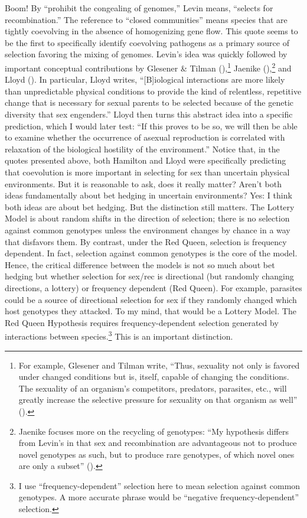 \documentclass[
  letterpaper,
]{book}
\begin{document}
Boom! By ``prohibit the congealing of genomes,'' Levin means, ``selects
for recombination.'' The reference to ``closed communities'' means
species that are tightly coevolving in the absence of homogenizing gene
flow. This quote seems to be the first to specifically identify
coevolving pathogens as a primary source of selection favoring the
mixing of genomes. Levin's idea was quickly followed by important
conceptual contributions by Glesener \& Tilman
(),\footnote{For example, Glesener and
  Tilman write, ``Thus, sexuality not only is favored under changed
  conditions but is, itself, capable of changing the conditions. The
  sexuality of an organism's competitors, predators, parasites, etc.,
  will greatly increase the selective pressure for sexuality on that
  organism as well'' ().} Jaenike
(),\footnote{Jaenike focuses more on
  the recycling of genotypes: ``My hypothesis differs from Levin's in
  that sex and recombination are advantageous not to produce novel
  genotypes as such, but to produce rare genotypes, of which novel ones
  are only a subset'' ().} and Lloyd
(). In particular, Lloyd writes,
``{[}B{]}iological interactions are more likely than unpredictable
physical conditions to provide the kind of relentless, repetitive change
that is necessary for sexual parents to be selected because of the
genetic diversity that sex engenders.'' Lloyd then turns this abstract
idea into a specific prediction, which I would later test: ``If this
proves to be so, we will then be able to examine whether the occurrence
of asexual reproduction is correlated with relaxation of the biological
hostility of the environment.'' Notice that, in the quotes presented
above, both Hamilton and Lloyd were specifically predicting that
coevolution is more important in selecting for sex than uncertain
physical environments. But it is reasonable to ask, does it really
matter? Aren't both ideas fundamentally about bet hedging in uncertain
environments? Yes: I think both ideas are about bet hedging. But the
distinction still matters. The Lottery Model is about random shifts in
the direction of selection; there is no selection against common
genotypes unless the environment changes by chance in a way that
disfavors them. By contrast, under the Red Queen, selection is frequency
dependent. In fact, selection against common genotypes is the core of
the model. Hence, the critical difference between the models is not so
much about bet hedging but whether selection for sex/rec is directional
(but randomly changing directions, a lottery) or frequency dependent
(Red Queen). For example, parasites could be a source of directional
selection for sex if they randomly changed which host genotypes they
attacked. To my mind, that would be a Lottery Model. The Red Queen
Hypothesis requires frequency-dependent selection generated by
interactions between species.\footnote{I use ``frequency-dependent''
  selection here to mean selection against common genotypes. A more
  accurate phrase would be ``negative frequency-dependent'' selection.}
This is an important distinction.
\end{document}

